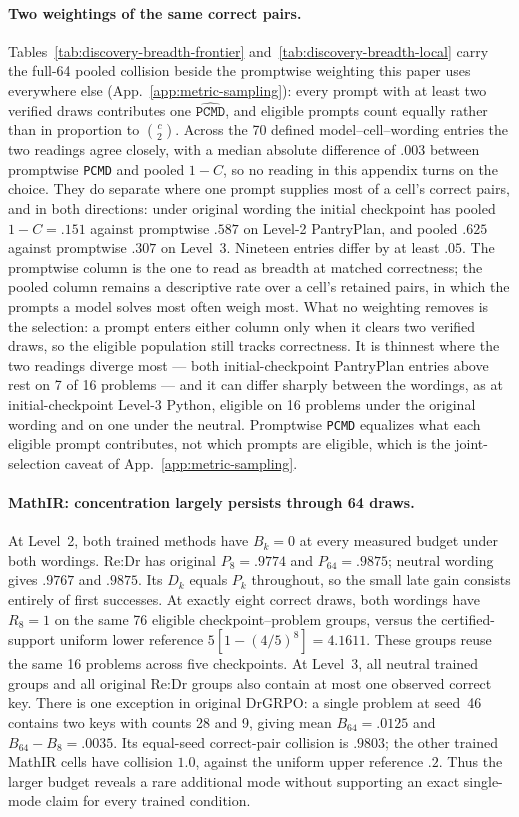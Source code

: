 \documentclass{article}
\newcommand{\1}{\mathbf 1}
\newcommand{\pmd}{\texttt{PCMD}}
\theoremstyle{remark}
\theoremstyle{definition}
\theoremstyle{plain}
\begin{document}
\paragraph{Two weightings of the same correct pairs.}
Tables~\ref{tab:discovery-breadth-frontier} and~\ref{tab:discovery-breadth-local}
carry the full-64 pooled collision beside the promptwise weighting this paper
uses everywhere else (App.~\ref{app:metric-sampling}): every prompt with at
least two verified draws contributes one $\widehat{\pmd}$, and eligible
prompts count equally rather than in proportion to $\binom{c}{2}$. Across the
70 defined model--cell--wording entries the two readings agree closely, with a
median absolute difference of $.003$ between promptwise \pmd{} and pooled
$1-C$, so no reading in this appendix turns on the choice. They do separate
where one prompt supplies most of a cell's correct pairs, and in both
directions: under original wording the initial checkpoint has pooled
$1-C=.151$ against promptwise $.587$ on Level-2 PantryPlan, and pooled $.625$
against promptwise $.307$ on Level~3. Nineteen entries differ by at least
$.05$. The promptwise column is the one to read as breadth at matched
correctness; the pooled column remains a descriptive rate over a cell's
retained pairs, in which the prompts a model solves most often weigh most.
What no weighting removes is the selection: a prompt enters either column
only when it clears two verified draws, so the eligible population still
tracks correctness. It is thinnest where the two readings diverge most ---
both initial-checkpoint PantryPlan entries above rest on 7 of 16 problems
--- and it can differ sharply between the wordings, as at initial-checkpoint
Level-3 Python, eligible on 16 problems under the original wording and on
one under the neutral. Promptwise \pmd{} equalizes what each eligible prompt
contributes, not which prompts are eligible, which is the joint-selection
caveat of App.~\ref{app:metric-sampling}.

\paragraph{MathIR: concentration largely persists through 64 draws.}
At Level~2, both trained methods have $B_k=0$ at every measured budget under
both wordings. Re:Dr has original $P_8=.9774$ and $P_{64}=.9875$;
neutral wording gives $.9767$ and $.9875$. Its $D_k$ equals $P_k$ throughout,
so the small late gain consists entirely of first successes. At exactly eight
correct draws, both wordings have $R_8=1$ on the same 76 eligible
checkpoint--problem groups, versus the certified-support uniform lower
reference $5[1-(4/5)^8]=4.1611$. These groups reuse the same 16 problems
across five checkpoints. At Level~3, all neutral trained groups and all
original Re:Dr groups also contain at most one observed correct key.
There is one exception in original DrGRPO: a single problem at seed~46
contains two keys with counts 28 and 9, giving mean $B_{64}=.0125$ and
$B_{64}-B_8=.0035$. Its equal-seed correct-pair collision is $.9803$;
the other trained MathIR cells have collision $1.0$, against the uniform
upper reference $.2$. Thus the larger budget reveals a rare additional mode
without supporting an exact single-mode claim for every trained condition.
\end{document}
